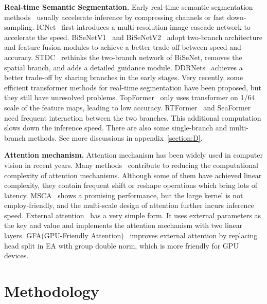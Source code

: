 \documentclass[letterpaper]{article} %
\begin{document}
\noindent
\textbf{Real-time Semantic Segmentation.} 
Early real-time semantic segmentation methods~\cite{paszke2016enet,wu2017real} usually accelerate inference by compressing channels or fast down-sampling. ICNet~\cite{zhao2018icnet} first introduces a multi-resolution image cascade network to accelerate the speed. BiSeNetV1~\cite{yu2018bisenet} and BiSeNetV2~\cite{yu2021bisenet} adopt two-branch architecture and feature fusion modules to achieve a better trade-off between speed and accuracy. STDC~\cite{fan2021rethinking} rethinks the two-branch network of BiSeNet, removes the spatial branch, and adds a detailed guidance module. DDRNets~\cite{pan2022deep} achieves a better trade-off by sharing branches in the early stages. Very recently, some efficient transformer methods for real-time segmentation have been proposed, but they still have unresolved problems. TopFormer~\cite{zhang2022topformer} only uses transformer on 1/64 scale of the feature maps, leading to low accuracy. RTFormer~\cite{wang2022rtformer} and SeaFormer~\cite{wan2023seaformer} need frequent interaction between the two branches. This additional computation slows down the inference speed. There are also some single-branch and multi-branch methods. See more discussions in appendix~\ref{section:D}.

\noindent
\textbf{Attention mechanism.} 
Attention mechanism has been widely used in computer vision in recent years. Many methods~\cite{chu2021twins,liu2021swin,fang2022msg} contribute to reducing the computational complexity of attention mechanisms. Although some of them have achieved linear complexity, they contain frequent shift or reshape operations which bring lots of latency. MSCA~\cite{guo2022segnext} shows a promising performance, but the large kernel is not employ-friendly, and the multi-scale design of attention further incurs inference speed. External attention~\cite{guo2022beyond} has a very simple form. It uses external parameters as the key and value and implements the attention mechanism with two linear layers. GFA(GPU-Friendly Attention)~\cite{wang2022rtformer} improves external attention by replacing head split in EA with group double norm, which is more friendly for GPU devices.



\section{Methodology}
\end{document}

